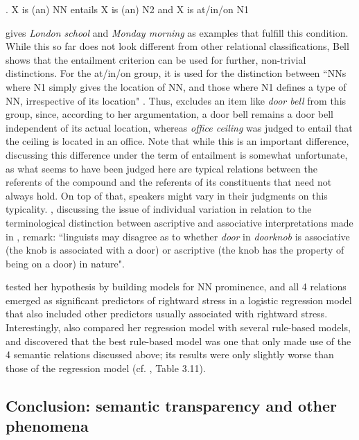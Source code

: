 \ex. X is (an) NN entails X is (an) N2 and X is at/in/on N1\\
\citet[69]{Bell:2012}

\citet[69]{Bell:2012} gives \emph{London school} and \emph{Monday
  morning} as examples that fulfill this condition. While this so far
does not look different from other relational classifications, Bell
shows that the
entailment criterion can be used for further, non-trivial
distinctions. For the at/in/on group, it is used for the distinction between ``NNs where N1 simply gives the
location of NN, and those where N1 defines a type of NN, irrespective
of its location" \citet[69]{Bell:2012}. Thus, \citet[69]{Bell:2012}
excludes an item like \emph{door bell} from this group, since, according to her
argumentation, a door bell remains a door bell independent of its
actual location, whereas \emph{office ceiling} was judged to entail
that the ceiling is located in an office. Note that while this is an
important difference, discussing this difference under the term of
entailment is somewhat unfortunate, as what seems to have been judged
here are typical relations between the referents of the compound and
the referents of its constituents that need not always hold. On top of
that, speakers might vary in their judgments on this typicality. \citet[447]{Baueretal:2013}, discussing
the issue of individual variation in relation to the terminological
distinction between ascriptive and associative interpretations made in
\citet{Giegerich:2009}, remark:
``linguists may disagree as to whether \emph{door} in \emph{doorknob}
is associative (the knob is associated with a door) or ascriptive (the
knob has the property of being on a door) in nature".

\citet{Bell:2012} tested her hypothesis by building models for NN
prominence, and all 4 relations emerged as significant predictors of
rightward stress in a logistic regression model that also included
other predictors usually associated with rightward stress. Interestingly,
\citet{Bell:2012} also compared her regression model with several
rule-based models, and discovered that the best rule-based model was
one that only made
use of the 4 semantic relations discussed above; its results were only
slightly worse than those of the regression model
(cf. \citealt{Bell:2012}, Table 3.11).

\subsection{Conclusion: semantic transparency and other phenomena}
\label{sec:ST-and-other}

